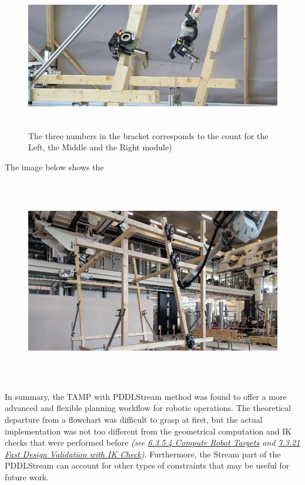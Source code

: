 \documentclass[11pt]{book}
\begin{document}
\begin{figure}[H]
\includegraphics[width=15.92cm,height=6.49cm]{./images/image35.jpeg}
\caption{The three numbers in the bracket corresponds to the count for the Left, the Middle and the Right module)}
\label{fig:three_numbers_bracket_corresponds_count}
\end{figure}


The image below shows the 

\begin{figure}[H]
\includegraphics[width=15.92cm,height=8.96cm]{./images/image36.jpeg}
\end{figure}


In summary, the TAMP with PDDLStream method was found to offer a more advanced and flexible planning workflow for robotic operations. The theoretical departure from a flowchart was difficult to grasp at first, but the actual implementation was not too different from the geometrical computation and IK checks that were performed before \textit{(see \uline{6.3.5.4 Compute Robot Targets} and \uline{7.3.21 Fast Design Validation with IK Check})}. Furthermore, the Stream part of the PDDLStream can account for other types of constraints that may be useful for future work. 
\end{document}
